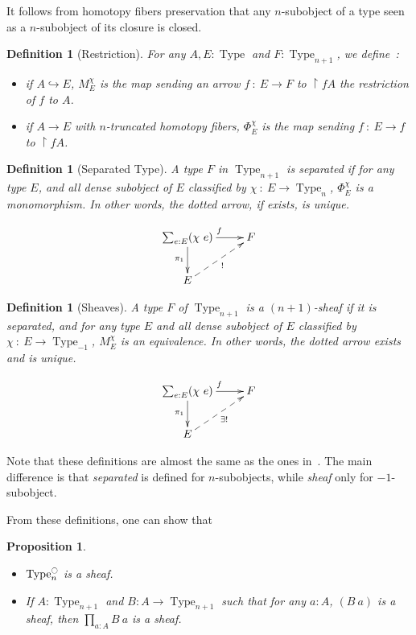 \documentclass[conference]{IEEEtran}
\newtheorem{prop}[thm]{Proposition}
\newtheorem{defi}[thm]{Definition}
\DeclareMathOperator{\Type}{Type}
\newcommand{\modal}{\ensuremath{\ocircle}}
\begin{document}
It follows from homotopy fibers preservation that any $n$-subobject of a type seen as a $n$-subobject
of its closure is closed.

\begin{defi}[Restriction]
  For any $A, E:\Type$ and $F:\Type_{n+1}$, we define~:
  \begin{itemize}
  \item if $A \hookrightarrow E$, $M_E^\chi$ is the map sending an
    arrow $f~:~E\to F$ to $\restriction f A$ the restriction of $f$ to $A$.
  \item if $A \to E$ with $n$-truncated homotopy fibers, $\Phi_E^\chi$ is the
    map sending $f~:~E \to f$ to $\restriction f A$.
  \end{itemize}
\end{defi}

\begin{defi}[Separated Type]
  A type $F$ in $\Type_{n+1}$ is {\em separated} if for any type $E$, and
  all dense subobject of $E$ classified by $\chi~:~E \to \Type_n$,
  $\Phi_E^\chi$ is a monomorphism. In other words, the dotted arrow,
  if exists, is unique.

  $$\xymatrix{
    \sum_{e:E} (\chi~ e) \ar[r]^f \ar[d]_{\pi_1} & F \\
    E \ar@{-->}[ru]_{!}&
  }$$
\end{defi}

\begin{defi}[Sheaves]
  A type $F$ of $\Type_{n+1}$ is a {\em $(n+1)$-sheaf} if it is
  separated, and for any type $E$ and all dense subobject of $E$
  classified by $\chi~:~E \to \Type_{-1}$, $M_E^\chi$ is an
  equivalence. In other words, the dotted arrow exists and is unique.

  $$\xymatrix{
    \sum_{e:E} (\chi~ e) \ar[r]^f \ar[d]_{\pi_1} & F \\
    E \ar@{-->}[ru]_{\exists !}&
  }$$
\end{defi}

Note that these definitions are almost the same as the ones
in~\cite{maclanemoerdijk}. The main difference is that {\em separated}
is defined for $n$-subobjects,
while {\em sheaf} only for $-1$-subobject.

From these definitions, one can show that
\begin{prop}\label{prop:sheaf_prop}
  \begin{itemize}
  \item $\Type_n^\modal$ is a sheaf.
  \item If $A:\Type_{n+1}$ and $B:A \to \Type_{n+1}$ such that for any
    $a:A$, $(B~a)$ is a sheaf, then $\prod_{a:A}B~a$ is a sheaf.
  \end{itemize}
\end{prop}
\end{document}
